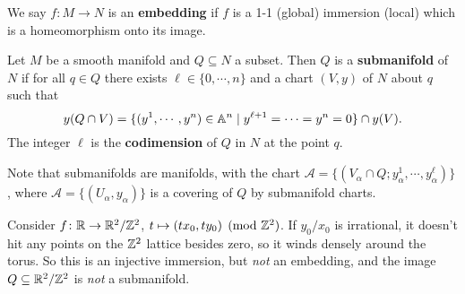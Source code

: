 \begin{definition}[]
       We say $f \colon M \to N$ is an \textbf{embedding} if $f$ is a 1-1 (global) immersion (local) which is a homeomorphism onto its image.
\end{definition}
\begin{definition}[]
    Let $M$ be a smooth manifold and $Q \subseteq N$ a subset. Then $Q$ is a \textbf{submanifold} of $N$ if for all $q \in Q$ there exists $\ell \in \{0,\cdots ,n\} $ and a chart $(V,y)$ of $N$ about $q$ such that\[
        y(Q\cap V)=\{(y^1,\cdots ,y^n )\in \mathbb{A}^n \mid y^{\ell+1}=\cdots=y^n =0 \} \cap y(V).
    \] The integer $\ell$ is the \textbf{codimension} of $Q$ in $N$ at the point $q$.
\end{definition}
\begin{remark}
    Note that submanifolds are manifolds, with the chart $\mathcal{A} =\{(V_{\alpha} \cap Q; y^1_{\alpha },\cdots ,y_{\alpha }^{\ell})\} $, where $\mathcal{A} =\{(U_{\alpha} ,y_{\alpha })\} $ is a covering of $Q$ by submanifold charts.
\end{remark}
\begin{example}
    Consider $f \colon \mathbb{R} \to \mathbb{R}^2 / \mathbb{Z}^2$, $t \mapsto  (tx_0, ty_0) \pmod{\mathbb{Z}^2}$. If $y_0 /x_0$ is irrational, it doesn't hit any points on the $\mathbb{Z}^2$ lattice besides zero, so it winds densely around the torus. So this is an injective immersion, but \emph{not} an embedding, and the image $Q \subseteq \mathbb{R}^2 /\mathbb{Z}^2$ is \emph{not} a submanifold.
\end{example}
